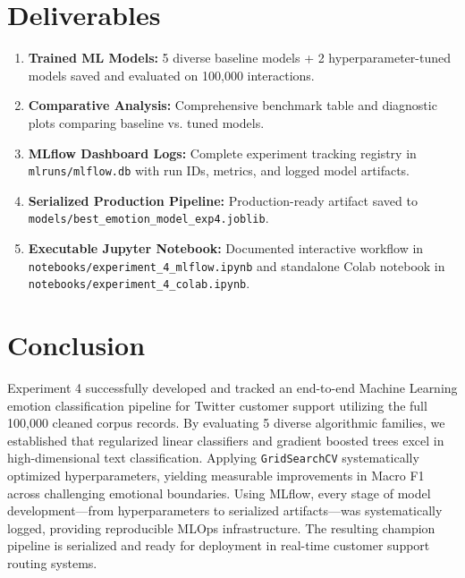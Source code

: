 \documentclass[11pt, a4paper]{article}
\begin{document}
\section*{Deliverables}
\begin{enumerate}[leftmargin=1.5em]
    \item \textbf{Trained ML Models:} 5 diverse baseline models + 2 hyperparameter-tuned models saved and evaluated on 100,000 interactions.
    \item \textbf{Comparative Analysis:} Comprehensive benchmark table and diagnostic plots comparing baseline vs. tuned models.
    \item \textbf{MLflow Dashboard Logs:} Complete experiment tracking registry in \texttt{mlruns/mlflow.db} with run IDs, metrics, and logged model artifacts.
    \item \textbf{Serialized Production Pipeline:} Production-ready artifact saved to \texttt{models/best\_emotion\_model\_exp4.joblib}.
    \item \textbf{Executable Jupyter Notebook:} Documented interactive workflow in \texttt{notebooks/experiment\_4\_mlflow.ipynb} and standalone Colab notebook in \texttt{notebooks/experiment\_4\_colab.ipynb}.
\end{enumerate}

\section*{Conclusion}
Experiment 4 successfully developed and tracked an end-to-end Machine Learning emotion classification pipeline for Twitter customer support utilizing the full 100,000 cleaned corpus records. 
By evaluating 5 diverse algorithmic families, we established that regularized linear classifiers and gradient boosted trees excel in high-dimensional text classification. 
Applying \texttt{GridSearchCV} systematically optimized hyperparameters, yielding measurable improvements in Macro F1 across challenging emotional boundaries. 
Using MLflow, every stage of model development—from hyperparameters to serialized artifacts—was systematically logged, providing reproducible MLOps infrastructure. 
The resulting champion pipeline is serialized and ready for deployment in real-time customer support routing systems.
\end{document}
